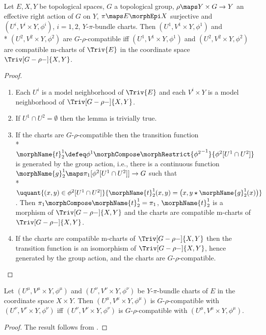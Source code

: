 \documentclass{article}
\begin{document}
\begin{lemma}
\label{lem:Grho-compat}
Let $E,X,Y$ be topological spaces, $G$ a topological group,
$\rho \maps Y \times G \to Y$ an effective right action of
$G$ on $Y$, $\pi \maps E \morphEpi X$ surjective
and $(U^i, V^i \times Y, \phi^i)$, $i=1,2$, $Y$-$\pi$-bundle charts.
Then $(U^1, V^1 \times Y, \phi^1)$ and \\*
$(U^2, V^2 \times Y, \phi^2)$ are $G$-$\rho$-compatible iff
$(U^1, V^1 \times Y, \phi^1)$ and
$(U^2, V^2 \times Y, \phi^2)$ are compatible m-charts of
$\Triv{E}$ in the coordinate space
$\Triv[G-\rho-]{X,Y}$.

\begin{proof}
\begin{enumerate}
\leavevmode
\item
Each $U^i$ is a model neighborhood of $\Triv{E}$ and each $V^i \times Y$
is a model neighborhood of $\Triv[G-\rho-]{X,Y}$.

\item
If $U^1 \cap U^2 = \emptyset$ then the lemma is trivially true.

\item
If the charts are $G$-$\rho$-compatible then the transition function \\*
$
  \morphName{t}^1_2 \defeq
    \phi^1 \morphCompose
    \morphRestrict{{\phi^2}^{-1}}{\phi^2[U^1 \cap U^2]}
$
is generated by the group action, i.e., there is a continuous function
$\morphName{g}^1_2 \maps \pi_1[\phi^2[U^1 \cap U^2]] \to G$
such that \\*
$
  \uquant
    {{(x,y) \in \phi^2[U^1 \cap U^2]}}
    {
      \morphName{t}^1_2(x,y) =
      \bigl ( x, y \star \morphName{g}^1_2(x) \bigr )
    }
$.
Then $\pi_1 \morphCompose \morphName{t}^1_2 = \pi_1$, $\morphName{t}^1_2$ is a
morphism of $\Triv[G-\rho-]{X,Y}$ and the charts are compatible m-charts
of $\Triv[G-\rho-]{X,Y}$.

\item
If the charts are compatible m-charts of $\Triv[G-\rho-]{X,Y}$ then the
transition function is an isomorphism of $\Triv[G-\rho-]{X,Y}$, hence
generated by the group action, and the charts are $G$-$\rho$-compatible.
\end{enumerate}
\end{proof}
\end{lemma}

\begin{corollary}
\label{cor:Grho-compatsym}
Let $(U^\mu, V^\mu \times Y, \phi^\mu)$ and \linebreak
$(U^\nu, V^\nu \times Y, \phi^\nu)$ be $Y$-$\pi$-bundle charts of $E$ in the
coordinate space $X \times Y$. Then
$(U^\mu, V^\mu \times Y, \phi^\mu)$ is $G$-$\rho$-compatible with
$(U^\nu, V^\nu \times Y, \phi^\nu)$ iff
$(U^\nu, V^\nu \times Y, \phi^\nu)$ is $G$-$\rho$-compatible with
$(U^\mu, V^\mu \times Y, \phi^\mu)$.
\begin{proof}
The result follows from .
\end{proof}
\end{corollary}
\end{document}

